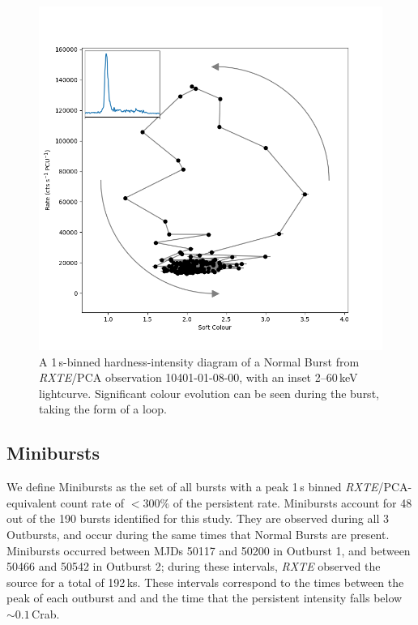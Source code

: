 \begin{figure}
  \centering
  \includegraphics[width=.9\linewidth, trim={0.4cm 1cm 1.1cm 1cm},clip]{images/Loop1.png}
  \caption{\small A 1\,s-binned hardness-intensity diagram of a Normal Burst from \textit{RXTE}/PCA observation 10401-01-08-00, with an inset 2--60\,keV lightcurve.  Significant colour evolution can be seen during the burst, taking the form of a loop.}
  \label{fig:loop}
\end{figure}

\subsection{Minibursts}

\par We define Minibursts as the set of all bursts with a peak 1\,s binned \textit{RXTE}/PCA-equivalent count rate of $<300\%$ of the persistent rate.  Minibursts account for 48 out of the 190 bursts identified for this study.  They are observed during all 3 Outbursts, and occur during the same times that Normal Bursts are present.  Minibursts occurred between MJDs 50117 and 50200 in Outburst 1, and between 50466 and 50542 in Outburst 2; during these intervals, \textit{RXTE} observed the source for a total of 192\,ks.  These intervals correspond to the times between the peak of each outburst and and the time that the persistent intensity falls below $\sim0.1$\,Crab.

